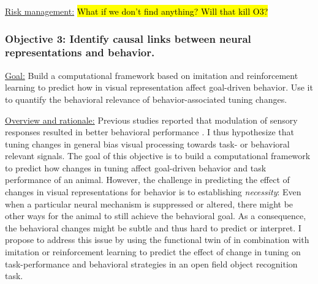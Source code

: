 \documentclass[COG,11pt]{ercgrant}
\begin{document}
\underline{Risk management:} \hl{What if we don't find anything? Will that kill O3?}

\subsubsection{Objective 3: Identify causal links between neural representations and behavior.\hfill{}}
\underline{Goal:} Build a computational framework based on imitation and reinforcement learning to predict how in visual representation affect goal-driven behavior. 
Use it to quantify the behavioral relevance of behavior-associated tuning changes.

\underline{Overview and rationale:} 
Previous studies reported that modulation of sensory responses resulted in better behavioral performance \parencite{Spitzer1988-kq, Bennett2013-rk, Dadarlat2017-jw, De_Gee2022-ir}.
I thus hypothesize that tuning changes in general bias visual processing towards task- or behavioral relevant signals.
The goal of this objective is to build a computational framework to predict how changes in tuning affect goal-driven behavior and task performance of an animal. 
However, the challenge in predicting the effect of changes in visual representations for behavior is to establishing \textit{necessity}: Even when a particular neural mechanism is suppressed or altered, there might be other ways for the animal to still achieve the behavioral goal. 
As a consequence, the behavioral changes might be subtle and thus hard to predict or interpret.
I propose to address this issue by using the functional twin of in combination with imitation or reinforcement learning to predict the effect of change in tuning on task-performance and behavioral strategies in an open field object recognition task. 
\end{document}

